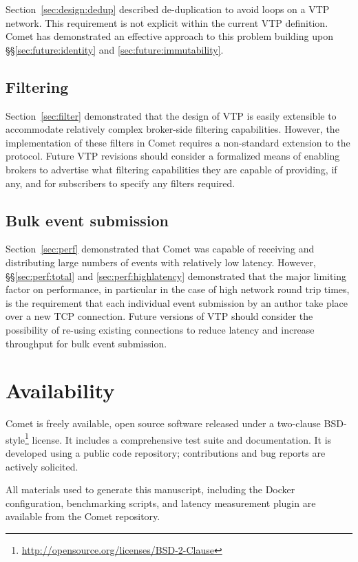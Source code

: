 \documentclass[5p,authoryear]{elsarticle}
\begin{document}
Section~\ref{sec:design:dedup} described de-duplication to avoid loops on a
VTP network. This requirement is not explicit within the current VTP
definition. Comet has demonstrated an effective approach to this problem
building upon \S\S\ref{sec:future:identity} and \ref{sec:future:immutability}.

\subsection{Filtering}
\label{sec:future:filter}

Section~\ref{sec:filter} demonstrated that the design of VTP is easily
extensible to accommodate relatively complex broker-side filtering
capabilities. However, the implementation of these filters in Comet requires a
non-standard extension to the protocol. Future VTP revisions should consider a
formalized means of enabling brokers to advertise what filtering capabilities
they are capable of providing, if any, and for subscribers to specify any
filters required.

\subsection{Bulk event submission}
\label{sec:future:bulk}

Section~\ref{sec:perf} demonstrated that Comet was capable of receiving and
distributing large numbers of events with relatively low latency. However,
\S\S\ref{sec:perf:total} and \ref{sec:perf:highlatency} demonstrated that
the major limiting factor on performance, in particular in the case of high
network round trip times, is the requirement that each individual event
submission by an author take place over a new TCP connection.  Future versions
of VTP should consider the possibility of re-using existing connections to
reduce latency and increase throughput for bulk event submission.

\section{Availability}
\label{sec:avail}

Comet is freely available, open source software released under a two-clause
BSD-style\footnote{\url{http://opensource.org/licenses/BSD-2-Clause}} license.
It includes a comprehensive test suite and documentation. It is developed
using a public code repository; contributions and bug reports are actively
solicited.

All materials used to generate this manuscript, including the Docker
configuration, benchmarking scripts, and latency measurement plugin are
available from the Comet repository.
\end{document}
